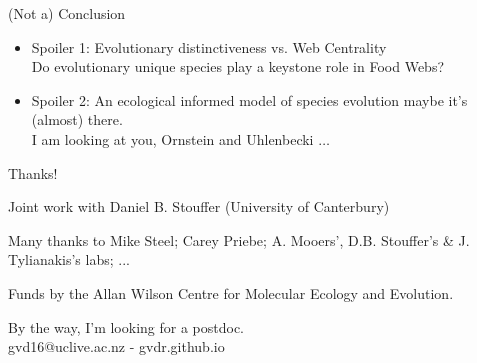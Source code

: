 \documentclass[]{beamer}
\begin{document}
\begin{frame}{(Not a) Conclusion}

\begin{itemize}[<+->]
\item
  Spoiler 1: Evolutionary distinctiveness vs. Web Centrality\\
  {\small Do evolutionary unique species play a keystone role in Food Webs?}
\item
  Spoiler 2: An ecological informed model of species evolution maybe
  it's (almost) there.\\
  {\small I am looking at you, Ornstein and Uhlenbecki $\dots$}
\end{itemize}

\end{frame}

\begin{frame}{Thanks!}

\begin{centering}

Joint work with  
Daniel B. Stouffer (University of Canterbury)

Many thanks to  
Mike Steel; Carey Priebe; A. Mooers', D.B. Stouffer's \& J. Tylianakis's labs; ...

Funds by the Allan Wilson Centre for Molecular Ecology and Evolution.

\vspace{2cm}

\small{By the way, I'm looking for a postdoc.\\ gvd16@uclive.ac.nz - gvdr.github.io}

\end{centering}

\end{frame}
\end{document}
